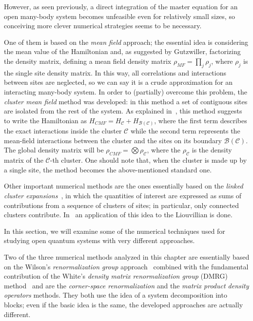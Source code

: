 However, as seen previously, a direct integration of the master equation for an open many-body system becomes unfeasible even for relatively small sizes, so conceiving more clever numerical strategies seems to be necessary.

One of them is based on the \emph{mean field} approach; the essential idea is considering the mean value of the Hamiltonian and, as suggested by Gutzwiller, factorizing the density matrix, defining a mean field density matrix $\rho_{MF} = \prod_j\rho_j$, where $\rho_j$ is the single site density matrix. In this way, all correlations and interactions between sites are neglected, so we can say it is a crude approximation for an interacting many-body system. In order to (partially) overcome this problem, the \emph{cluster mean field} method was developed: in this method a set of contiguous sites are isolated from the rest of the system. As explained in~\cite{jin_biella_ross}, this method suggests to write the Hamiltonian as $H_{CMF} = H_\mathcal{C} + H_{\mathcal{B(C)}}$, where the first term describes the exact interactions inside the cluster $\mathcal{C}$ while the second term represents the mean-field interactions between the cluster and the sites on its boundary $\mathcal{B(C)}$. The global density matrix will be $\rho_{CMF} = \bigotimes \rho_\mathcal{C}$, where the $\rho_\mathcal{C}$ is the density matrix of the $\mathcal{C}$-th cluster. One should note that, when the cluster is made up by a single site, the method becomes the above-mentioned standard one. 

Other important numerical methods are the ones essentially based on the \emph{linked cluster expansions}~\cite{oitmaa}, in which the quantities of interest are expressed as sums of contributions from a sequence of clusters of sites; in particular, only connected clusters contribute. In~\cite{PhysRevX.6.021037} an application of this idea to the Liouvillian is done.

In this section, we will examine some of the numerical techniques used for studying open quantum systems with very different approaches.

Two of the three numerical methods analyzed in this chapter are essentially based on the Wilson's \emph{renormalization group} approach~\cite{RevModPhys.47.773} combined with the fundamental contribution of the White's \emph{density matrix renormalization group} (DMRG) method~\cite{s_white:dmrg} and are the \emph{corner-space renormalization} and the \emph{matrix product density operators} methods. They both use the idea of a system decomposition into blocks; even if the basic idea is the same, the developed approaches are actually different.

